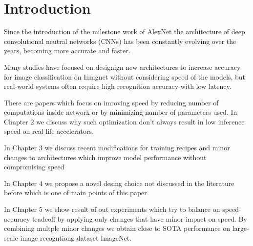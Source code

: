 

\chapter{Introduction}



Since the introduction of the milestone work of AlexNet \cite{alexnet??} the architecture of deep convolutional neutral networks (CNNs) has been constantly evolving over the years, becoming more accurate and faster. 

Many studies have focused on designign new architectures to increase accuracy for image classification on Imagnet without considering speed of the models, but real-world systems often require high recognition accuracy with low latency.

There are papers which focus on imroving speed by reducing number of computations inside network or by minimizing number of parameters used. In Chapter 2 we discuss why such optimization don't always result in low inference speed on real-life accelerators.


In Chapter 3 we discuss recent modifications for training recipes and minor changes to architectures which improve model performance without compromising speed

In Chapter 4 we propose a novel desing choice not discussed in the literature before which is one of main points of this paper

In Chapter 5 we show result of out experiments which try to balance on speed-accuracy tradeoff by applying only changes that have minor impact on speed. By combining multple minor changes we obtain close to SOTA performance on large-scale image recogntiong dataset ImageNet. 


